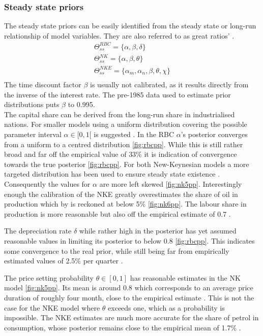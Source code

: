 \documentclass[12pt,a4paper,english]{article} %
\begin{document}
	\subsubsection{Steady state priors}
	The steady state priors can be easily identified from the steady state or long-run relationship of model variables. They are also referred to as great  ratios' \cite{kydland_time_1982}.
	\begin{equation}
		\begin{aligned}
			\Theta_{ss}^{RBC} = \{ \alpha, \beta, \delta \} \\
			\Theta_{ss}^{NK} = \{\alpha, \beta, \theta \} \\
			\Theta_{ss}^{NKE} = \{\alpha_m, \alpha_n, \beta, \theta, \chi \} \\
		\end{aligned}
	\end{equation}
	The time discount factor $\beta$ is usually not calibrated, as it results directly from the inverse of the interest rate. The pre-1985 data used to estimate prior distributions puts $\beta$ to 0.995. \\
	The capital share can be derived from the long-run share in industrialised nations. For smaller models using a uniform distribution covering the possible parameter interval $\alpha \in [0,1[$ is suggested \cite{del_negro_forming_2008}. In the RBC $\alpha$'s posterior converges from a uniform to a centred distribution \ref{fig:rbcpp}. While this is still rather broad and far off the empirical value of 33\% it is indication of convergence towards the true posterior \ref{fig:rbcpp}.
	For both New-Keynesian models a more targeted distribution has been used to ensure steady state existence \cite{guerron-quintana_bayesian_2013}. Consequently the values for $\alpha$ are more left skewed \ref{fig:nk5pp}. Interestingly enough the calibration of the NKE greatly overestimates the share of oil in production which by \cite{blanchard_macroeconomic_2007} is reckoned at below 5\% \ref{fig:nk6pp}. The labour share in production is more reasonable but also off the empirical estimate of 0.7 \cite{blanchard_macroeconomic_2007}.
	
	The depreciation rate $\delta$ while rather high in the posterior has yet assumed reasonable values in limiting its posterior to below 0.8 \ref{fig:rbcpp}. This indicates some convergence to the real prior, while still being far from empirically estimated values of 2.5\% per quarter \cite{campbell_inspecting_1994}.
	
	The price setting probability $\theta \in [0,1]$ has reasonable estimates in the NK model \ref{fig:nk5pp}. Its mean is around 0.8 which corresponds to an average price duration of roughly four month, close to the empirical estimate \cite{blanchard_macroeconomic_2007}. This is not the case for the NKE model where $\theta$ exceeds one, which as a probability is impossible. The NKE estimates are much more accurate for the share of petrol in consumption, whose posterior remains close to the empirical mean of 1.7\% \cite{blanchard_macroeconomic_2007}.
\end{document}
